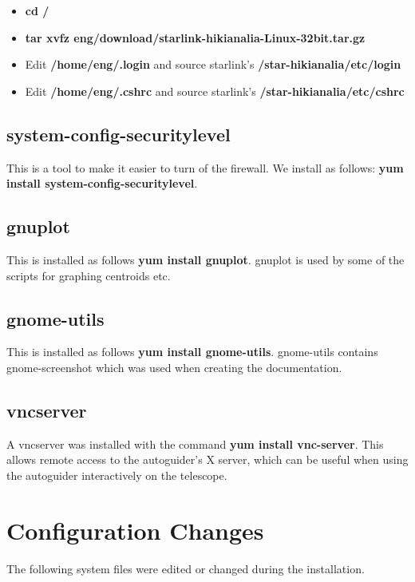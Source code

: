 \documentclass[10pt,a4paper]{article}
\begin{document}
\begin{itemize}
\item {\bf cd /}
\item {\bf tar xvfz \mytilde eng/download/starlink-hikianalia-Linux-32bit.tar.gz}
\item Edit {\bf /home/eng/.login} and source starlink's {\bf /star-hikianalia/etc/login}
\item Edit {\bf /home/eng/.cshrc} and source starlink's {\bf /star-hikianalia/etc/cshrc}
\end{itemize}

\subsection{system-config-securitylevel}

This is a tool to make it easier to turn of the firewall. We install as follows:
 {\bf yum install system-config-securitylevel}.

\subsection{gnuplot}

This is installed as follows {\bf yum install gnuplot}. gnuplot is used by some of the scripts
for graphing centroids etc.

\subsection{gnome-utils}

This is installed as follows {\bf yum install gnome-utils}. gnome-utils contains gnome-screenshot which was used when creating the documentation.

\subsection{vncserver}

A vncserver was installed with the command {\bf yum install vnc-server}. This allows remote access to the autoguider's
X server, which can be useful when using the autoguider interactively on the telescope.

\section{Configuration Changes}

The following system files were edited or changed during the installation.
\end{document}
